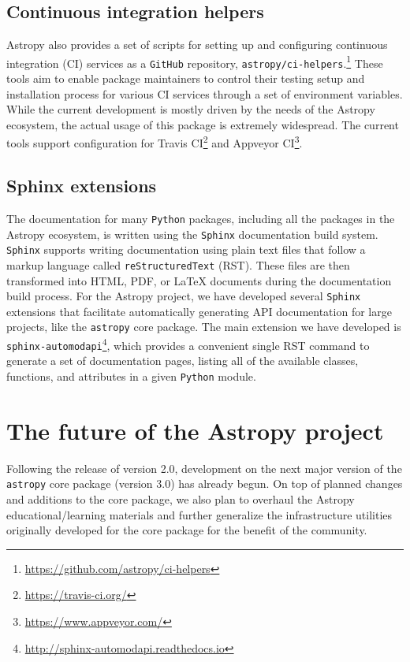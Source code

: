 \documentclass[modern]{aastex62}
\newcommand{\package}[1]{\texttt{#1}\xspace}
\newcommand{\github}{\package{GitHub}}
\newcommand{\python}{\package{Python}}
\newcommand{\astropy}{Astropy\xspace}
\newcommand{\astropypkg}{\package{astropy}}
\begin{document}
\subsection{Continuous integration helpers}

\astropy also provides a set of scripts for setting up and configuring
continuous integration (CI) services as a \github repository,
\package{astropy/ci-helpers}.\footnote{\url{https://github.com/astropy/ci-helpers}}
These tools aim to enable package maintainers to control their testing setup
and installation process for various CI services through a
set of environment variables.
While the current development is mostly driven by the needs of the \astropy
ecosystem, the actual usage of this package is extremely widespread. The current
tools support configuration for Travis CI\footnote{\url{https://travis-ci.org/}} and
Appveyor CI\footnote{\url{https://www.appveyor.com/}}.

\subsection{Sphinx extensions}

The documentation for many \python packages, including
all the packages in the \astropy ecosystem, is written using the
\package{Sphinx} documentation build system.
\package{Sphinx} supports writing documentation using plain text files
that follow a markup language called \texttt{reStructuredText} (RST).
These files are then transformed into HTML, PDF, or \LaTeX{} documents
during the documentation build process.
For the \astropy project, we have developed several \package{Sphinx} extensions
that facilitate automatically generating API documentation for large projects,
like the \astropypkg core package.
The main extension we have developed is
\package{sphinx-automodapi}\footnote{\url{http://sphinx-automodapi.readthedocs.io}},
which provides a convenient single RST command to generate a set of
documentation pages, listing all of the available classes, functions, and
attributes in a given \python module.

\section{The future of the Astropy project}
\label{sec:future}

Following the release of version 2.0, development on the next major version of
the \astropypkg core package (version 3.0) has already begun.
On top of planned changes and additions to the core package, we also plan to
overhaul the \astropy educational/learning materials and further
generalize the infrastructure utilities originally developed for the core
package for the benefit of the community.
\end{document}
